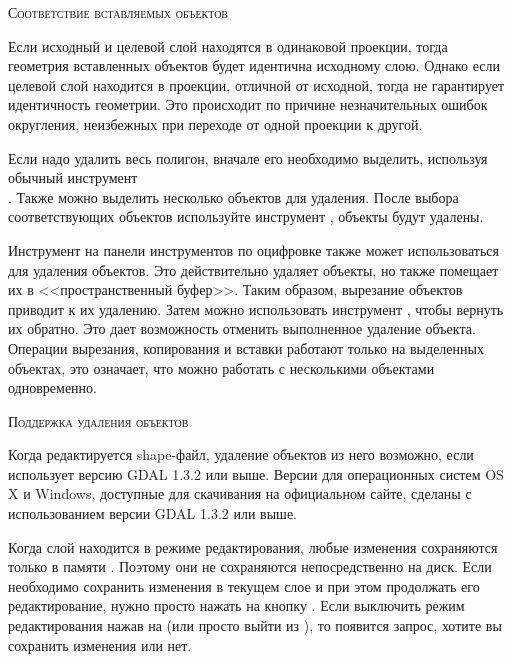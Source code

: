 \begin{Tip}\caption{\textsc{Соответствие вставляемых объектов}}
Если исходный и целевой слой находятся в одинаковой проекции, тогда
геометрия вставленных объектов будет идентична исходному слою. Однако если
целевой слой находится в проекции, отличной от исходной, тогда \qg не гарантирует
идентичность геометрии. Это происходит по причине незначительных ошибок
округления, неизбежных при переходе от одной проекции к другой.
\end{Tip}


Если надо удалить весь полигон, вначале его необходимо выделить, используя
обычный инструмент \\
. Также можно
выделить несколько объектов для удаления. После выбора соответствующих
объектов используйте инструмент
, объекты будут удалены.

Инструмент  на панели
инструментов по оцифровке также может использоваться для удаления объектов.
Это действительно удаляет объекты, но также помещает их в <<пространственный
буфер>>. Таким образом, вырезание объектов приводит к их удалению. Затем можно
использовать инструмент ,
чтобы вернуть их обратно. Это дает возможность отменить выполненное удаление
объекта. Операции вырезания, копирования и вставки работают только на
выделенных объектах, это означает, что можно работать с несколькими объектами
одновременно.

\begin{Tip}\caption{\textsc{Поддержка удаления объектов}}
Когда редактируется shape-файл, удаление объектов из него возможно, если
\qg использует версию GDAL 1.3.2 или выше. Версии \qg для операционных
систем OS\,X и Windows, доступные для скачивания на официальном сайте,
сделаны с использованием версии GDAL 1.3.2 или выше.
\end{Tip}


Когда слой находится в режиме редактирования, любые изменения сохраняются
только в памяти \qg. Поэтому они не сохраняются непосредственно на диск.
Если необходимо сохранить изменения в текущем слое и при этом продолжать
его редактирование, нужно просто нажать на кнопку
. Если выключить режим
редактирования нажав на 
(или просто выйти из \qg), то появится запрос, хотите вы сохранить
изменения или нет.

